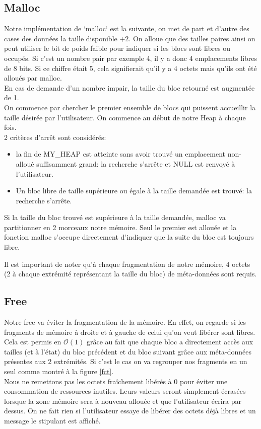 \documentclass{article}
\begin{document}
\subsection{Malloc}
Notre implémentation de `malloc` est la suivante, on met de part et d'autre des cases des données la taille disponible $+2$. On alloue que des tailles paires ainsi on peut utiliser le bit de poids faible pour indiquer si les blocs sont libres ou occupés.  Si c'est un nombre pair par exemple 4, il y a donc 4 emplacements libres de 8 bits. Si ce chiffre était 5, cela signifierait qu'il y a 4 octets mais qu'ils ont été alloués par malloc.\\ 
En cas de demande d'un nombre impair, la taille du bloc retourné est augmentée de 1.\\
On commence par chercher le premier ensemble de blocs qui puissent accueillir la taille désirée par l'utilisateur. On commence au début de notre Heap à chaque fois.\\
2 critères d'arrêt sont considérés:
\begin{itemize}
    \item la fin de MY\_HEAP est atteinte sans avoir trouvé un emplacement non-alloué suffisamment grand: la recherche s'arrête et NULL est renvoyé à l'utilisateur.
    \item Un bloc libre de taille supérieure ou égale à la taille demandée est trouvé: la recherche s'arrête. \newline
\end{itemize}

Si la taille du bloc trouvé est supérieure à la taille demandée, malloc va partitionner en 2 morceaux notre mémoire. Seul le premier est allouée et la fonction malloc s'occupe directement d'indiquer que la suite du bloc est toujours libre.

Il est important de noter qu'à chaque fragmentation de notre mémoire, 4 octets (2 à chaque extrémité représentant la taille du bloc) de méta-données sont requis.

\subsection{Free}
\label{free}
Notre free va éviter la fragmentation de la mémoire. En effet, on regarde si les fragments de mémoire à droite et à gauche de celui qu'on veut libérer sont libres.
Cela est permis en $\mathcal{O}(1)$ grâce au fait que chaque bloc a directement accès aux tailles (et à l'état) du bloc précédent et du bloc suivant grâce aux méta-données présentes aux 2 extrémités.
Si c'est le cas on va regrouper nos fragments en un seul comme montré à la figure \ref{fct}.\\
Nous ne remettons pas les octets fraîchement libérés à 0 pour éviter une consommation de ressources inutiles. Leurs valeurs seront simplement écrasées lorsque la zone mémoire sera à nouveau allouée et que l'utilisateur écrira par dessus. On ne fait rien si l'utilisateur essaye de libérer des octets déjà libres et un message le stipulant est affiché.
\end{document}
